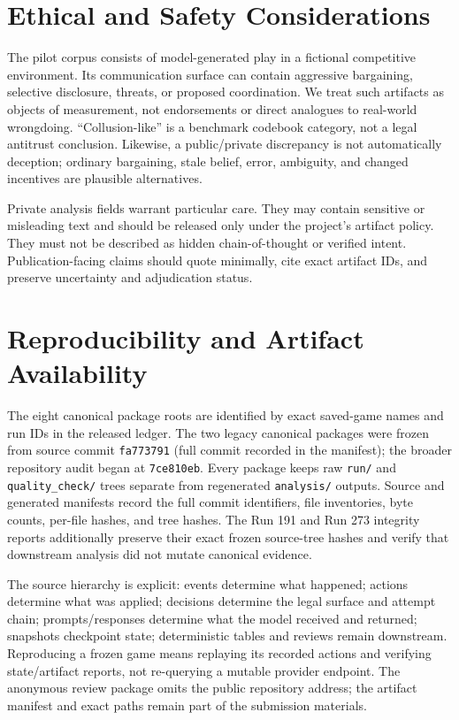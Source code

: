 \documentclass[conference]{IEEEtran}
\newcommand{\code}[1]{\texttt{#1}}
\begin{document}
\section{Ethical and Safety Considerations}
\label{sec:ethics}

The pilot corpus consists of model-generated play in a fictional competitive environment. Its communication surface can contain aggressive bargaining, selective disclosure, threats, or proposed coordination. We treat such artifacts as objects of measurement, not endorsements or direct analogues to real-world wrongdoing. ``Collusion-like'' is a benchmark codebook category, not a legal antitrust conclusion. Likewise, a public/private discrepancy is not automatically deception; ordinary bargaining, stale belief, error, ambiguity, and changed incentives are plausible alternatives.

Private analysis fields warrant particular care. They may contain sensitive or misleading text and should be released only under the project's artifact policy. They must not be described as hidden chain-of-thought or verified intent. Publication-facing claims should quote minimally, cite exact artifact IDs, and preserve uncertainty and adjudication status.

\section{Reproducibility and Artifact Availability}
\label{sec:repro}

The eight canonical package roots are identified by exact saved-game names and run IDs in the released ledger. The two legacy canonical packages were frozen from source commit \code{fa773791} (full commit recorded in the manifest); the broader repository audit began at \code{7ce810eb}. Every package keeps raw \code{run/} and \code{quality\_check/} trees separate from regenerated \code{analysis/} outputs. Source and generated manifests record the full commit identifiers, file inventories, byte counts, per-file hashes, and tree hashes. The Run 191 and Run 273 integrity reports additionally preserve their exact frozen source-tree hashes and verify that downstream analysis did not mutate canonical evidence.

The source hierarchy is explicit: events determine what happened; actions determine what was applied; decisions determine the legal surface and attempt chain; prompts/responses determine what the model received and returned; snapshots checkpoint state; deterministic tables and reviews remain downstream. Reproducing a frozen game means replaying its recorded actions and verifying state/artifact reports, not re-querying a mutable provider endpoint. The anonymous review package omits the public repository address; the artifact manifest and exact paths remain part of the submission materials.
\end{document}
